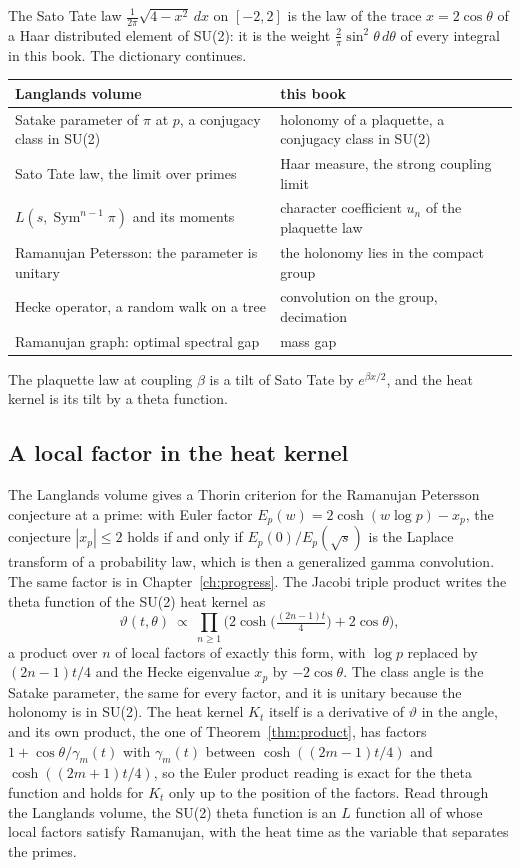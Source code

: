 The Sato Tate law $\frac1{2\pi}\sqrt{4-x^2}\,dx$ on $[-2,2]$ is the law of the trace $x=2\cos\theta$ of a Haar distributed element of SU(2): it is the weight $\frac2\pi\sin^2\theta\,d\theta$ of every integral in this book. The dictionary continues.
\begin{center}
\small
\begin{tabular}{p{}p{}}
\toprule
Langlands volume & this book \\ \midrule
Satake parameter of $\pi$ at $p$, a conjugacy class in SU(2) & holonomy of a plaquette, a conjugacy class in SU(2) \\
Sato Tate law, the limit over primes & Haar measure, the strong coupling limit \\
$L(s,\operatorname{Sym}^{n-1}\pi)$ and its moments & character coefficient $u_n$ of the plaquette law \\
Ramanujan Petersson: the parameter is unitary & the holonomy lies in the compact group \\
Hecke operator, a random walk on a tree & convolution on the group, decimation \\
Ramanujan graph: optimal spectral gap & mass gap \\
\bottomrule
\end{tabular}
\end{center}
The plaquette law at coupling $\beta$ is a tilt of Sato Tate by $e^{\beta x/2}$, and the heat kernel is its tilt by a theta function.

\subsection{A local factor in the heat kernel}

The Langlands volume gives a Thorin criterion for the Ramanujan Petersson conjecture at a prime: with Euler factor $E_p(w)=2\cosh(w\log p)-x_p$, the conjecture $|x_p|\le2$ holds if and only if $E_p(0)/E_p(\sqrt s)$ is the Laplace transform of a probability law, which is then a generalized gamma convolution. The same factor is in Chapter~\ref{ch:progress}. The Jacobi triple product writes the theta function of the SU(2) heat kernel as
\[
\vartheta(t,\theta)\ \propto\ \prod_{n\ge1}\Big(2\cosh\big(\tfrac{(2n-1)t}4\big)+2\cos\theta\Big),
\]
a product over $n$ of local factors of exactly this form, with $\log p$ replaced by $(2n-1)t/4$ and the Hecke eigenvalue $x_p$ by $-2\cos\theta$. The class angle is the Satake parameter, the same for every factor, and it is unitary because the holonomy is in SU(2). The heat kernel $K_t$ itself is a derivative of $\vartheta$ in the angle, and its own product, the one of Theorem~\ref{thm:product}, has factors $1+\cos\theta/\gamma_m(t)$ with $\gamma_m(t)$ between $\cosh((2m-1)t/4)$ and $\cosh((2m+1)t/4)$, so the Euler product reading is exact for the theta function and holds for $K_t$ only up to the position of the factors. Read through the Langlands volume, the SU(2) theta function is an $L$ function all of whose local factors satisfy Ramanujan, with the heat time as the variable that separates the primes.


